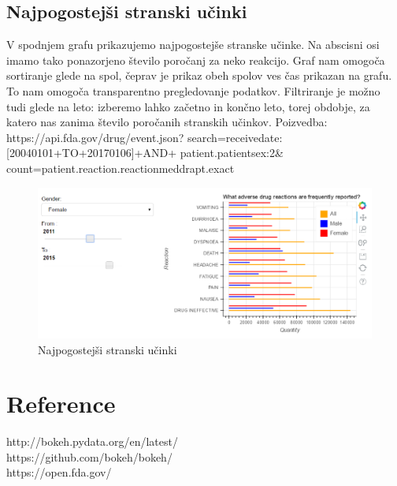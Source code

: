 \documentclass[a4paper,10pt]{article}
\begin{document}
\subsection{Najpogostejši stranski učinki}
V spodnjem grafu prikazujemo najpogostejše stranske učinke. Na abscisni osi imamo tako ponazorjeno število poročanj za neko reakcijo. Graf nam omogoča sortiranje glede na spol, čeprav je prikaz obeh spolov ves čas prikazan na grafu. To nam omogoča transparentno pregledovanje podatkov. Filtriranje je možno tudi glede na leto: izberemo lahko začetno in končno leto, torej obdobje, za katero nas zanima število poročanih stranskih učinkov. Poizvedba: \\

https://api.fda.gov/drug/event.json? \newline search=receivedate:[20040101+TO+20170106]+AND+ \newline patient.patientsex:2\& \newline count=patient.reaction.reactionmeddrapt.exact \\
\begin{figure}[H]
  \caption{Najpogostejši stranski učinki}
  \centering
    \includegraphics[width=1\textwidth]{reakcije.png}
\end{figure}

\section{Reference}
http://bokeh.pydata.org/en/latest/ \\
https://github.com/bokeh/bokeh/ \\
https://open.fda.gov/
\end{document}
